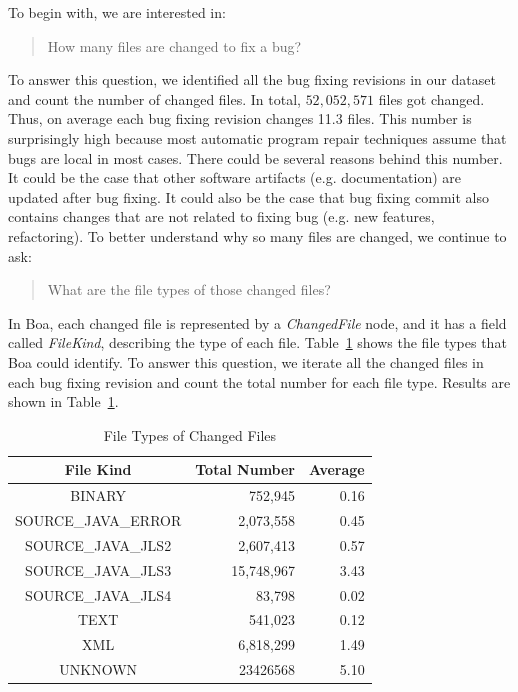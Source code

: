 \documentclass{sig-alternate-05-2015}
\begin{document}
To begin with, we are interested in:

\begin{quote}
	How many files are changed to fix a bug?
\end{quote}

To answer this question, we identified all the bug fixing revisions in our
dataset and count the number of changed files. In total, $52,052,571$ files got
changed. Thus, on average each bug fixing revision changes 11.3 files.  This
number is surprisingly high because most automatic program repair techniques
assume that bugs are local in most cases. There could be several reasons behind
this number. It could be the case that other software artifacts (e.g.
documentation) are updated after bug fixing. It could also be the case that bug
fixing commit also contains changes that are not related to fixing bug (e.g. new
features, refactoring). To better understand why so many files are changed, we
continue to ask:

\begin{quote}
	What are the file types of those changed files?
\end{quote}

In Boa, each changed file is represented by a \emph{ChangedFile} node, and it
has a field called \emph{FileKind}, describing the type of each file.
Table~\ref{tbl:fileType} shows the file types that Boa could identify. To answer
this question, we iterate all the changed files in each bug fixing revision and
count the total number for each file type. Results are shown in
Table~\ref{tbl:fileType}.

\begin{table}
\centering
  \begin{tabular}{| c | r | r |}
  \hline
  File Kind & Total Number & Average \\ \hline \hline
  BINARY & 752,945 & 0.16 \\ \hline
  SOURCE\_JAVA\_ERROR & 2,073,558 & 0.45 \\ \hline
  SOURCE\_JAVA\_JLS2 & 2,607,413 & 0.57 \\ \hline
  SOURCE\_JAVA\_JLS3 & 15,748,967 & 3.43 \\ \hline
  SOURCE\_JAVA\_JLS4 & 83,798 & 0.02 \\ \hline
  TEXT & 541,023 & 0.12 \\ \hline
  XML & 6,818,299 & 1.49 \\ \hline
  UNKNOWN & 23426568 & 5.10 \\ \hline
  \end{tabular}
  \caption{File Types of Changed Files}
  \label{tbl:fileType}
\end{table}
\end{document}
